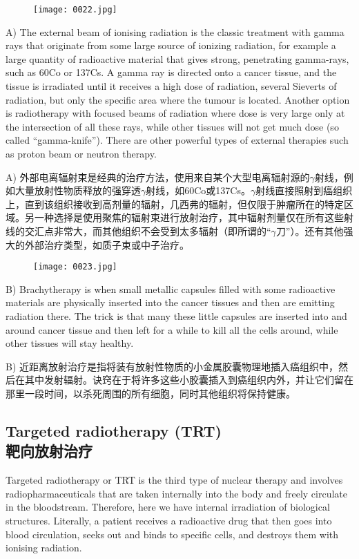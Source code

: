 \documentclass[dvipsnames, svgnames,a4paper,11pt]{article}
\begin{document}
\begin{figure}[htbp]
      \centering
      \texttt{[image: 0022.jpg]}
       \label{fig11}
  \end{figure}

A) The external beam of ionising radiation is the classic treatment with gamma rays that originate from some large source of ionizing radiation, for example a large quantity of radioactive material that gives strong, penetrating gamma-rays, such as 60Co or 137Cs. A gamma ray is directed onto a cancer tissue, and the tissue is irradiated until it receives a high dose of radiation, several Sieverts of radiation, but only the specific area where the tumour is located. Another option is radiotherapy with focused beams of radiation where dose is very large only at the intersection of all these rays, while other tissues will not get much dose (so called “gamma-knife”). There are other powerful types of external therapies such as proton beam or neutron therapy.

A) 外部电离辐射束是经典的治疗方法，使用来自某个大型电离辐射源的$\gamma$射线，例如大量放射性物质释放的强穿透$\gamma$射线，如60Co或137Cs。$\gamma$射线直接照射到癌组织上，直到该组织接收到高剂量的辐射，几西弗的辐射，但仅限于肿瘤所在的特定区域。另一种选择是使用聚焦的辐射束进行放射治疗，其中辐射剂量仅在所有这些射线的交汇点非常大，而其他组织不会受到太多辐射（即所谓的“$\gamma$刀”）。还有其他强大的外部治疗类型，如质子束或中子治疗。

\begin{figure}[htbp]
      \centering
      \texttt{[image: 0023.jpg]}
       \label{fig12}
  \end{figure}

B) Brachytherapy is when small metallic capsules filled with some radioactive materials are physically inserted into the cancer tissues and then are emitting radiation there. The trick is that many these little capsules are inserted into and around cancer tissue and then left for a while to kill all the cells around, while other tissues will stay healthy.

B) 近距离放射治疗是指将装有放射性物质的小金属胶囊物理地插入癌组织中，然后在其中发射辐射。诀窍在于将许多这些小胶囊插入到癌组织内外，并让它们留在那里一段时间，以杀死周围的所有细胞，同时其他组织将保持健康。

\subsection{Targeted radiotherapy (TRT) \\靶向放射治疗}  
Targeted radiotherapy or TRT is the third type of nuclear therapy and involves radiopharmaceuticals that are taken internally into the body and freely circulate in the bloodstream. Therefore, here we have internal irradiation of biological structures. Literally, a patient receives a radioactive drug that then goes into blood circulation, seeks out and binds to specific cells, and destroys them with ionising radiation.  
\end{document}
